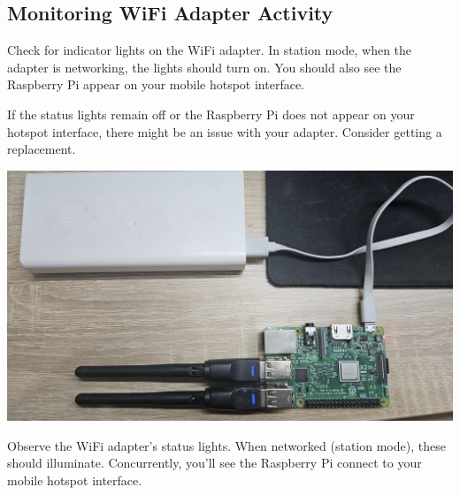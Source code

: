 \documentclass[
  letterpaper,
]{scrbook}
\begin{document}
\hypertarget{monitoring-wifi-adapter-activity}{%
\subsection{Monitoring WiFi Adapter
Activity}\label{monitoring-wifi-adapter-activity}}

Check for indicator lights on the WiFi adapter. In station mode, when
the adapter is networking, the lights should turn on. You should also
see the Raspberry Pi appear on your mobile hotspot interface.

\begin{tcolorbox}[enhanced jigsaw, left=2mm, coltitle=black, colframe=quarto-callout-note-color-frame, bottomrule=.15mm, colback=white, bottomtitle=1mm, breakable, colbacktitle=quarto-callout-note-color!10!white, titlerule=0mm, toptitle=1mm, arc=.35mm, rightrule=.15mm, opacityback=0, title=\textcolor{quarto-callout-note-color}{\faInfo}\hspace{0.5em}{Note}, toprule=.15mm, leftrule=.75mm, opacitybacktitle=0.6]

If the status lights remain off or the Raspberry Pi does not appear on
your hotspot interface, there might be an issue with your adapter.
Consider getting a replacement.

\end{tcolorbox}

\includegraphics{content/material/ch2/adapter_light.jpg}

Observe the WiFi adapter's status lights. When networked (station mode),
these should illuminate. Concurrently, you'll see the Raspberry Pi
connect to your mobile hotspot interface.
\end{document}
